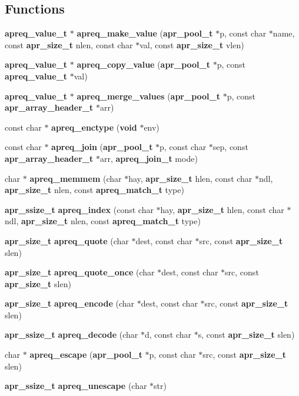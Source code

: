 \subsection*{Functions}
\begin{CompactItemize}
\item 
{\bf apreq\_\-value\_\-t} $\ast$ {\bf apreq\_\-make\_\-value} ({\bf apr\_\-pool\_\-t} $\ast$p, const char $\ast$name, const {\bf apr\_\-size\_\-t} nlen, const char $\ast$val, const {\bf apr\_\-size\_\-t} vlen)
\item 
{\bf apreq\_\-value\_\-t} $\ast$ {\bf apreq\_\-copy\_\-value} ({\bf apr\_\-pool\_\-t} $\ast$p, const {\bf apreq\_\-value\_\-t} $\ast$val)
\item 
{\bf apreq\_\-value\_\-t} $\ast$ {\bf apreq\_\-merge\_\-values} ({\bf apr\_\-pool\_\-t} $\ast$p, const {\bf apr\_\-array\_\-header\_\-t} $\ast$arr)
\item 
const char $\ast$ {\bf apreq\_\-enctype} ({\bf void} $\ast$env)
\item 
const char $\ast$ {\bf apreq\_\-join} ({\bf apr\_\-pool\_\-t} $\ast$p, const char $\ast$sep, const {\bf apr\_\-array\_\-header\_\-t} $\ast$arr, {\bf apreq\_\-join\_\-t} mode)
\item 
char $\ast$ {\bf apreq\_\-memmem} (char $\ast$hay, {\bf apr\_\-size\_\-t} hlen, const char $\ast$ndl, {\bf apr\_\-size\_\-t} nlen, const {\bf apreq\_\-match\_\-t} type)
\item 
{\bf apr\_\-ssize\_\-t} {\bf apreq\_\-index} (const char $\ast$hay, {\bf apr\_\-size\_\-t} hlen, const char $\ast$ndl, {\bf apr\_\-size\_\-t} nlen, const {\bf apreq\_\-match\_\-t} type)
\item 
{\bf apr\_\-size\_\-t} {\bf apreq\_\-quote} (char $\ast$dest, const char $\ast$src, const {\bf apr\_\-size\_\-t} slen)
\item 
{\bf apr\_\-size\_\-t} {\bf apreq\_\-quote\_\-once} (char $\ast$dest, const char $\ast$src, const {\bf apr\_\-size\_\-t} slen)
\item 
{\bf apr\_\-size\_\-t} {\bf apreq\_\-encode} (char $\ast$dest, const char $\ast$src, const {\bf apr\_\-size\_\-t} slen)
\item 
{\bf apr\_\-ssize\_\-t} {\bf apreq\_\-decode} (char $\ast$d, const char $\ast$s, const {\bf apr\_\-size\_\-t} slen)
\item 
char $\ast$ {\bf apreq\_\-escape} ({\bf apr\_\-pool\_\-t} $\ast$p, const char $\ast$src, const {\bf apr\_\-size\_\-t} slen)
\item 
{\bf apr\_\-ssize\_\-t} {\bf apreq\_\-unescape} (char $\ast$str)

\end{CompactItemize}
